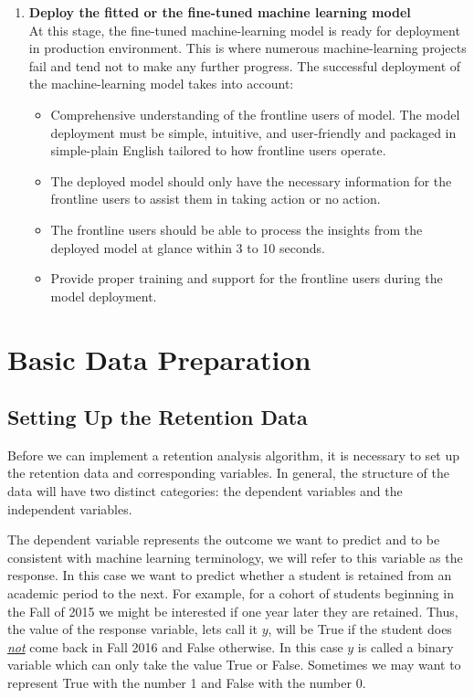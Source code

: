 \documentclass[12pt,a4paper,oneside]{book}
\begin{document}
\begin{enumerate}
\item \textbf{Deploy the fitted or the fine-tuned machine learning model}\\
At this stage, the fine-tuned machine-learning model is ready for deployment in production environment. This is where numerous machine-learning projects fail and tend not to make any further progress. The successful deployment of the machine-learning model takes into account:

\begin{itemize}

\item Comprehensive understanding of the frontline users of model. The model deployment must be simple, intuitive, and user-friendly and packaged in simple-plain English tailored to how frontline users operate.
\item The deployed model should only have the necessary information for the frontline users to assist them in taking action or no action.
\item The frontline users should be able to process the insights from the deployed model at glance within 3 to 10 seconds. 
\item Provide proper training and support for the frontline users during the model deployment.

\end{itemize}


\end{enumerate}






\chapter{Basic Data Preparation}

\section{Setting Up the Retention Data}

Before we can implement a retention analysis algorithm, it is necessary to set up the retention data and corresponding variables. In general, the structure of the data will have two distinct categories: the dependent variables and the independent variables. \par 

The dependent variable represents the outcome we want to predict and to be consistent with machine learning terminology, we will refer to this variable as the response. In this case we want to predict whether a student is retained from an academic period to the next. For example, for a cohort of students beginning in the Fall of 2015 we might be interested if one year later they are retained. Thus, the value of the response variable, lets call it $y$, will be True if the student does \textit{\underline{not}} come back in Fall 2016 and False otherwise. In this case $y$ is called a binary variable which can only take the value True or False. Sometimes we may want to represent True with the number 1 and False with the number 0.
\end{document}
